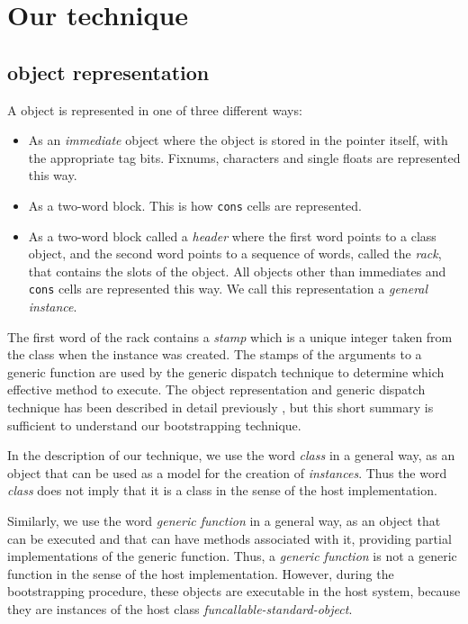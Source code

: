 \section{Our technique}
\label{sec-our-technique}

\subsection{\sicl{} object representation}
\label{sec-our-technique-object-representation}

A \sicl{} object is represented in one of three different ways:

\begin{itemize}
\item As an \emph{immediate} object where the object is stored in the
  pointer itself, with the appropriate tag bits.  Fixnums, characters
  and single floats are represented this way.
\item As a two-word block.  This is how \texttt{cons} cells are
  represented.
\item As a two-word block called a \emph{header} where the first word
  points to a class object, and the second word points to a sequence
  of words, called the \emph{rack}, that contains the slots of the
  object.  All objects other than immediates and \texttt{cons} cells
  are represented this way.  We call this representation a
  \emph{general instance}.
\end{itemize}

The first word of the rack contains a \emph{stamp} which is a unique
integer taken from the class when the instance was created.  The
stamps of the arguments to a generic function are used by the generic
dispatch technique to determine which effective method to execute.
The object representation and generic dispatch technique has been
described in detail previously
\cite{Strandh:2014:FGD:2635648.2635654}, but this short summary is
sufficient to understand our bootstrapping technique.

In the description of our technique, we use the word \emph{class} in a
general way, as an object that can be used as a model for the creation
of \emph{instances}.  Thus the word \emph{class} does not imply that
it is a class in the sense of the host \commonlisp{} implementation.

Similarly, we use the word \emph{generic function} in a general way,
as an object that can be executed and that can have methods associated
with it, providing partial implementations of the generic function.
Thus, a \emph{generic function} is not a generic
function in the sense of the host \commonlisp{} implementation.
However, during the bootstrapping procedure, these objects are
executable in the host system, because they are instances of the host
class \emph{funcallable-standard-object}.

